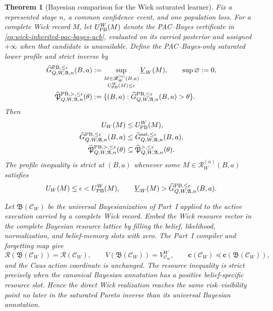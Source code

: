 \documentclass[11pt]{article}
\numberwithin{section}{part}
\theoremstyle{plain}
\newtheorem{theorem}{Theorem}[section]
\theoremstyle{definition}
\theoremstyle{remark}
\begin{document}
\begin{theorem}[Bayesian comparison for the Wick saturated learner]
\label{thm:wick-bayesian-comparison}
Fix a represented stage \(n\), a common confidence event, and one population
loss.  For a complete Wick record \(M\), let \(U_{\rm PB}^W(M)\) denote the
PAC--Bayes certificate in \eqref{eq:wick-inherited-pac-bayes-ucb}, evaluated
on its carried posterior and assigned \(+\infty\) when that candidate is
unavailable.  Define the PAC--Bayes-only saturated lower profile and strict
inverse by
\begin{align}
 \widehat G_{Q,W,\mathfrak A,n}^{\rm PB,\le\epsilon}(B,a)
 &:=%
 \sup_{\substack{M\in\mathscr R_W^{(n)}(B,a)\\
                  U_{\rm PB}^W(M)\le\epsilon}}
       \underline V_W(M),
 \qquad \sup\varnothing:=0,
 \label{eq:wick-pb-only-saturated-profile}\\
 \widehat{\mathfrak P}_{Q,W,\mathfrak A,n}^{\rm PB,>,\le\epsilon}(\theta)
 &:=%
 \{(B,a):
 \widehat G_{Q,W,\mathfrak A,n}^{\rm PB,\le\epsilon}(B,a)>\theta\}.
 \label{eq:wick-pb-only-strict-inverse}
\end{align}
Then
\begin{align}
 U_W(M)&\le U_{\rm PB}^W(M),
 \label{eq:wick-pb-pointwise-domination}\\
 \widehat G_{Q,W,\mathfrak A,n}^{\rm PB,\le\epsilon}(B,a)
 &\le
 \widehat G_{Q,W,\mathfrak A,n}^{\mathrm{sat},\le\epsilon}(B,a),
 \label{eq:wick-pb-profile-domination}\\
 \widehat{\mathfrak P}_{Q,W,\mathfrak A,n}^{\rm PB,>,\le\epsilon}(\theta)
 &\subseteq
 \widehat{\mathfrak P}_{Q,W,\mathfrak A,n}^{>,\le\epsilon}(\theta).
 \label{eq:wick-pb-inverse-domination}
\end{align}
The profile inequality is strict at \((B,a)\) whenever some
\(M\in\mathscr R_W^{(n)}(B,a)\) satisfies
\begin{equation}
 U_W(M)\le\epsilon<U_{\rm PB}^W(M),
 \qquad
 \underline V_W(M)>
 \widehat G_{Q,W,\mathfrak A,n}^{\rm PB,\le\epsilon}(B,a).
 \label{eq:wick-strict-pb-improvement-cell}
\end{equation}

Let \(\mathfrak B(\mathscr C_W)\) be the universal Bayesianization of
Part~I applied to the active execution carried by a complete Wick record.
Embed the Wick resource vector in the complete Bayesian resource lattice by
filling the belief, likelihood, normalization, and belief-memory slots with
zero.  The Part~I compiler and forgetting map give
\begin{equation}
 \mathcal R(\mathfrak B(\mathscr C_W))=\mathcal R(\mathscr C_W),
 \qquad
 V(\mathfrak B(\mathscr C_W))=V^W_{\mathscr C_W},
 \qquad
 \mathbf c(\mathscr C_W)\preceq
 \mathbf c(\mathfrak B(\mathscr C_W)),
 \label{eq:wick-direct-versus-bayesianized-record}
\end{equation}
and the Caus action coordinate is unchanged.  The resource inequality is
strict precisely when the canonical Bayesian annotation has a positive
belief-specific resource slot.  Hence the direct Wick realization reaches
the same risk--visibility point no later in the saturated Pareto inverse than
its universal Bayesian annotation.


\end{theorem}
\end{document}

